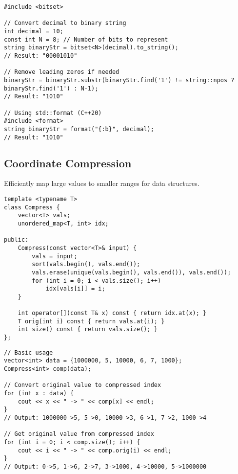 \documentclass[11pt,a4paper]{article}
\begin{document}
\begin{lstlisting}[caption={Decimal to Binary Conversion}]
#include <bitset>

// Convert decimal to binary string
int decimal = 10;
const int N = 8; // Number of bits to represent
string binaryStr = bitset<N>(decimal).to_string();
// Result: "00001010"

// Remove leading zeros if needed
binaryStr = binaryStr.substr(binaryStr.find('1') != string::npos ? binaryStr.find('1') : N-1);
// Result: "1010"

// Using std::format (C++20)
#include <format>
string binaryStr = format("{:b}", decimal);
// Result: "1010"
\end{lstlisting}

\newpage

\subsection{Coordinate Compression}
Efficiently map large values to smaller ranges for data structures.

\begin{lstlisting}[caption={Coordinate Compression Template}]
template <typename T>
class Compress {
    vector<T> vals;
    unordered_map<T, int> idx;

public:
    Compress(const vector<T>& input) {
        vals = input;
        sort(vals.begin(), vals.end());
        vals.erase(unique(vals.begin(), vals.end()), vals.end());
        for (int i = 0; i < vals.size(); i++)
            idx[vals[i]] = i;
    }

    int operator[](const T& x) const { return idx.at(x); }
    T orig(int i) const { return vals.at(i); }
    int size() const { return vals.size(); }
};
\end{lstlisting}

\begin{lstlisting}[caption={Coordinate Compression Example}]
// Basic usage
vector<int> data = {1000000, 5, 10000, 6, 7, 1000};
Compress<int> comp(data);

// Convert original value to compressed index
for (int x : data) {
    cout << x << " -> " << comp[x] << endl;
}
// Output: 1000000->5, 5->0, 10000->3, 6->1, 7->2, 1000->4

// Get original value from compressed index
for (int i = 0; i < comp.size(); i++) {
    cout << i << " -> " << comp.orig(i) << endl;
}
// Output: 0->5, 1->6, 2->7, 3->1000, 4->10000, 5->1000000
\end{lstlisting}
\end{document}
